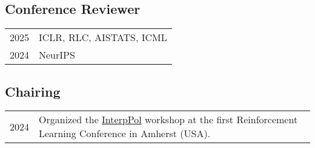 

\subsection*{Conference Reviewer}
% 
\begin{longtable}[l]{@{}p{} p{}}

    2025 & ICLR, RLC, AISTATS, ICML \\
    2024 & NeurIPS
    
\end{longtable}

\subsection*{Chairing}
% 
\begin{longtable}[l]{@{}p{} p{}}

    2024 & Organized the \href{https://sites.google.com/view/interppol-workshop/home?authuser=0}{InterpPol} workshop at the first Reinforcement Learning Conference in Amherst (USA).
    
\end{longtable}



